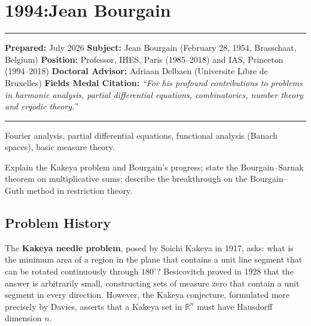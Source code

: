 \chapter{1994:Jean Bourgain}\label{ch1994jeanbourgain:jean-bourgain-fields-medal-1994-a-comprehensive-report-on-his-work-and-impact}

\begin{center}\rule{0.5\linewidth}{0.5pt}\end{center}

\textbf{Prepared:} July 2026
\textbf{Subject:} Jean Bourgain (February 28, 1954, Brasschaat, Belgium)
\textbf{Position:} Professor, IHES, Paris (1985--2018) and IAS, Princeton (1994--2018)
\textbf{Doctoral Advisor:} Adriaan Delbaen (Universite Libre de Bruxelles)
\textbf{Fields Medal Citation:} \emph{``For his profound contributions to problems
in harmonic analysis, partial differential equations, combinatorics,
number theory and ergodic theory.''}

\begin{center}\rule{0.5\linewidth}{0.5pt}\end{center}

\begin{prereqs}
Fourier analysis, partial differential equations, functional
analysis (Banach spaces), basic measure theory.
\end{prereqs}

\begin{objectives}
Explain the Kakeya problem and Bourgain's progress; state the
Bourgain--Sarnak theorem on multiplicative sums; describe the
breakthrough on the Bourgain--Guth method in restriction theory.
\end{objectives}

\section{Problem History}

The \textbf{Kakeya needle problem}, posed by Soichi Kakeya in 1917,
asks: what is the minimum area of a region in the plane that
contains a unit line segment that can be rotated continuously
through $180^\circ$?  Besicovitch proved in 1928 that the answer is
arbitrarily small, constructing sets of measure zero that contain a
unit segment in every direction.  However, the Kakeya conjecture,
formulated more precisely by Davies, asserts that a Kakeya set in
$\mathbb{R}^n$ must have Hausdorff dimension $n$.

